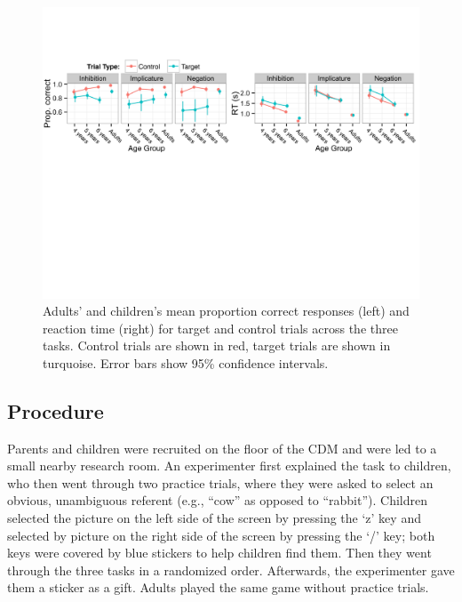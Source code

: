 \documentclass[man, noapacite]{apa2}
\begin{document}
\begin{figure}[t!]
\begin{center}
\includegraphics[width=\textwidth]{figures/correct_RT_v2.pdf}
\caption{\label{fig:traditional} Adults' and children's mean proportion correct responses (left) and reaction time (right) for target and control trials across the three tasks. Control trials are shown in red, target trials are shown in turquoise. Error bars show 95\% confidence intervals. }
\end{center}
\end{figure}

\subsection{Procedure}

Parents and children were recruited on the floor of the CDM and were led to a small nearby research room.   An experimenter first explained the task to children, who then went through two practice trials, where they were asked to select an obvious, unambiguous referent (e.g., ``cow'' as opposed to ``rabbit''). Children selected the picture on the left side of the screen by pressing the `z' key and selected by picture on the right side of the screen by pressing the `/' key; both keys were covered by blue stickers to help children find them. Then they went through the three tasks in a randomized order. Afterwards, the experimenter gave them a sticker as a gift. Adults played the same game without practice trials.
\end{document}
